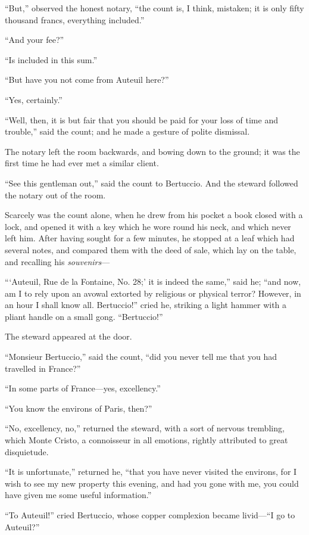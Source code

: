 “But,” observed the honest notary, “the count is, I think, mistaken; it
is only fifty thousand francs, everything included.”

“And your fee?”

“Is included in this sum.”

“But have you not come from Auteuil here?”

“Yes, certainly.”

“Well, then, it is but fair that you should be paid for your loss of
time and trouble,” said the count; and he made a gesture of polite
dismissal.

The notary left the room backwards, and bowing down to the ground; it
was the first time he had ever met a similar client.

“See this gentleman out,” said the count to Bertuccio. And the steward
followed the notary out of the room.

Scarcely was the count alone, when he drew from his pocket a book
closed with a lock, and opened it with a key which he wore round his
neck, and which never left him. After having sought for a few minutes,
he stopped at a leaf which had several notes, and compared them with
the deed of sale, which lay on the table, and recalling his
\textit{souvenirs}—

“‘Auteuil, Rue de la Fontaine, No. 28;’ it is indeed the same,” said
he; “and now, am I to rely upon an avowal extorted by religious or
physical terror? However, in an hour I shall know all. Bertuccio!”
cried he, striking a light hammer with a pliant handle on a small gong.
“Bertuccio!”

The steward appeared at the door.

“Monsieur Bertuccio,” said the count, “did you never tell me that you
had travelled in France?”

“In some parts of France—yes, excellency.”

“You know the environs of Paris, then?”

“No, excellency, no,” returned the steward, with a sort of nervous
trembling, which Monte Cristo, a connoisseur in all emotions, rightly
attributed to great disquietude.

“It is unfortunate,” returned he, “that you have never visited the
environs, for I wish to see my new property this evening, and had you
gone with me, you could have given me some useful information.”

“To Auteuil!” cried Bertuccio, whose copper complexion became livid—“I
go to Auteuil?”

